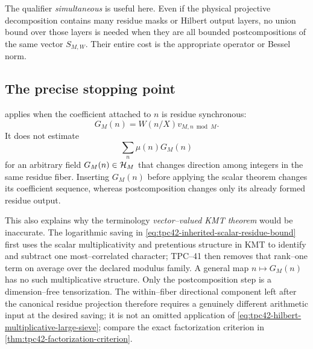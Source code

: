 The qualifier \emph{simultaneous} is useful here.  Even if the physical
projective decomposition contains many residue masks or Hilbert output
layers, no union bound over those layers is needed when they are all
bounded postcompositions of the same vector \(S_{M,W}\).  Their entire
cost is the appropriate operator or Bessel norm.

\subsection{The precise stopping point}

 applies when the
coefficient attached to \(n\) is residue synchronous:
\begin{equation}
 G_M(n)=W(n/X)v_{M,n\bmod M}.
 \label{eq:tpc42-residue-synchronous-field}
\end{equation}
It does not estimate
\begin{equation}
 \sum_n\mu(n)G_M(n)
 \label{eq:tpc42-preweighted-vector-sum}
\end{equation}
for an arbitrary field \(G_M(n)\in\mathcal H_M\) that changes direction among
integers in the same residue fiber.  Inserting \(G_M(n)\) before applying
the scalar theorem changes its coefficient sequence, whereas
postcomposition changes only its already formed residue output.

This also explains why the terminology \emph{vector--valued KMT theorem}
would be inaccurate.  The logarithmic saving in
\eqref{eq:tpc42-inherited-scalar-residue-bound} first uses the scalar
multiplicativity and pretentious structure in KMT to identify and
subtract one most--correlated character; TPC--41 then removes that
rank--one term on average over the declared modulus family.  A general
map \(n\mapsto G_M(n)\) has no such multiplicative structure.  Only the
postcomposition step is a dimension--free tensorization.  The
within--fiber directional component left after the canonical residue
projection therefore requires a genuinely different arithmetic input at
the desired saving; it is not an omitted application of
\eqref{eq:tpc42-hilbert-multiplicative-large-sieve}; compare the exact
factorization criterion in \cref{thm:tpc42-factorization-criterion}.

